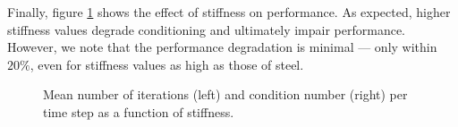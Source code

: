 Finally, figure \ref{fig:clutter_stiffness_study} shows the effect of stiffness
on performance. As expected, higher stiffness values degrade conditioning and
ultimately impair performance. However, we note that the performance degradation
is minimal --- only within $20\%$, even for stiffness values as high as those of
steel.

\begin{figure}[!h]
    \centering
    \caption{\label{fig:clutter_stiffness_study} Mean number of iterations (left) and
    condition number (right) per time step as a function of stiffness.}
\end{figure}
